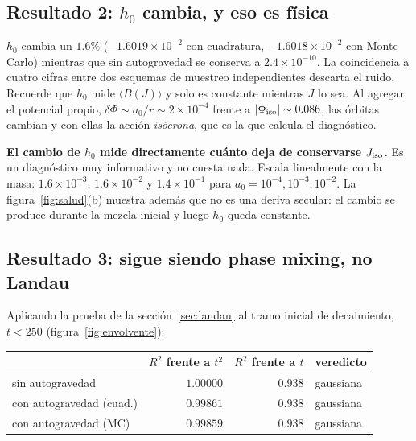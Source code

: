 \documentclass[11pt,a4paper]{article}
\newcommand{\Jr}{J}
\theoremstyle{definition}
\begin{document}
\subsection{\texorpdfstring{Resultado 2: $h_0$ cambia, y eso es física}{Resultado 2: h0 cambia, y eso es física}}

$h_0$ cambia un $1.6\%$ ($-1.6019\times10^{-2}$ con cuadratura,
$-1.6018\times10^{-2}$ con Monte Carlo) mientras que sin autogravedad se conserva a
$2.4\times10^{-10}$. La coincidencia a cuatro cifras entre dos esquemas de muestreo
independientes descarta el ruido. Recuerde que $h_0$ mide $\langle B(\Jr)\rangle$ y
solo es constante mientras $\Jr$ lo sea. Al agregar el potencial propio,
$\delta\Phi\sim a_0/r \sim 2\times10^{-4}$ frente a $|\Phi_{\rm iso}|\sim0.086$, las
órbitas cambian y con ellas la acción \emph{isócrona}, que es la que calcula el
diagnóstico.

\begin{idea}
\textbf{El cambio de $h_0$ mide directamente cuánto deja de conservarse
$\Jr_{\rm iso}$.} Es un diagnóstico muy informativo y no cuesta nada. Escala
linealmente con la masa: $1.6\times10^{-3}$, $1.6\times10^{-2}$ y
$1.4\times10^{-1}$ para $a_0=10^{-4},10^{-3},10^{-2}$. La
figura~\ref{fig:salud}(b) muestra además que no es una deriva secular: el cambio se
produce durante la mezcla inicial y luego $h_0$ queda constante.
\end{idea}

\subsection{Resultado 3: sigue siendo phase mixing, no Landau}

Aplicando la prueba de la sección~\ref{sec:landau} al tramo inicial de decaimiento,
$t<250$ (figura~\ref{fig:envolvente}):

\begin{center}
\begin{tabular}{lrrl}
\toprule
 & $R^2$ frente a $t^2$ & $R^2$ frente a $t$ & veredicto \\
\midrule
sin autogravedad         & $1.00000$ & $0.938$ & gaussiana \\
con autogravedad (cuad.) & $0.99861$ & $0.938$ & gaussiana \\
con autogravedad (MC)    & $0.99859$ & $0.938$ & gaussiana \\
\bottomrule
\end{tabular}
\end{center}
\end{document}
